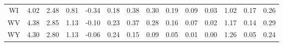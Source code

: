 \begin{table}
\begin{tabular}{cccccccccccccc}
   WI &  4.02 &  2.48 &  0.81 & -0.34 &  0.18 &  0.38 &  0.30 &  0.19 &  0.09 &  0.03 &    1.02 &     0.17 &      0.26 \\
   WV &  4.38 &  2.85 &  1.13 & -0.10 &  0.23 &  0.37 &  0.28 &  0.16 &  0.07 &  0.02 &    1.17 &     0.14 &      0.29 \\
   WY &  4.30 &  2.80 &  1.13 & -0.06 &  0.24 &  0.15 &  0.09 &  0.05 &  0.01 &  0.00 &    1.26 &     0.05 &      0.24 \\
\bottomrule
\end{tabular}
\end{table}
